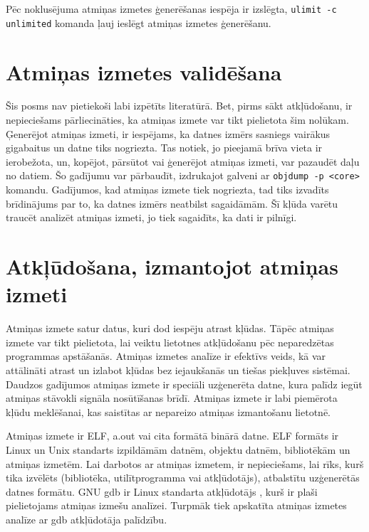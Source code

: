  Pēc noklusējuma atmiņas izmetes ģenerēšanas iespēja ir izslēgta,  \texttt{ulimit -c unlimited} komanda ļauj ieslēgt atmiņas izmetes ģenerēšanu.

 \section{ Atmiņas izmetes validēšana }
  \label{sec:validaty}
  
 Šis posms nav pietiekoši labi izpētīts literatūrā. Bet, pirms sākt atkļūdošanu, ir nepieciešams pārliecināties, ka atmiņas izmete var tikt pielietota šim nolūkam.
 Ģenerējot atmiņas izmeti, ir iespējams, ka datnes izmērs sasniegs vairākus gigabaitus un datne tiks nogriezta.
 Tas notiek, jo pieejamā brīva vieta ir ierobežota, un, kopējot, pārsūtot vai ģenerējot atmiņas izmeti, var pazaudēt daļu no datiem.
 Šo gadījumu var pārbaudīt, izdrukajot galveni ar \texttt{objdump -p <core>} komandu.
 Gadījumos, kad atmiņas izmete tiek nogriezta, tad tiks izvadīts brīdinājums par to, ka datnes izmērs neatbilst sagaidāmām.
 Šī kļūda varētu traucēt analizēt atmiņas izmeti, jo tiek sagaidīts, ka dati ir pilnīgi.
 
 
 
 
 
\section{Atkļūdošana, izmantojot atmiņas izmeti}
Atmiņas izmete satur datus, kuri dod iespēju atrast kļūdas. Tāpēc atmiņas izmete var tikt pielietota, lai veiktu lietotnes atkļūdošanu pēc neparedzētas programmas apstāšanās.
Atmiņas izmetes analīze ir efektīvs veids, kā var attālināti atrast un izlabot kļūdas bez iejaukšanās un tiešas piekļuves sistēmai.
Daudzos gadījumos atmiņas izmete ir speciāli uzģenerēta datne, kura palīdz iegūt atmiņas stāvokli signāla nosūtīšanas brīdī.
Atmiņas izmete ir labi piemērota kļūdu meklēšanai, kas saistītas ar nepareizo atmiņas izmantošanu lietotnē.

Atmiņas izmete ir ELF, a.out vai cita formātā binārā  datne. 
ELF formāts ir Linux un Unix standarts izpildāmām datnēm, objektu datnēm, bibliotēkām un atmiņas izmetēm.
Lai darbotos ar atmiņas izmetem, ir nepieciešams, lai rīks, kurš tika izvēlēts (bibliotēka, utilītprogramma vai atkļūdotājs), atbalstītu uzģenerētās datnes formātu.
GNU gdb ir  Linux standarta atkļūdotājs \cite{MWMK}, kurš ir plaši pielietojams atmiņas izmešu analīzei. 
Turpmāk tiek apskatīta atmiņas izmetes analīze ar gdb atkļūdotāja palīdzību.

